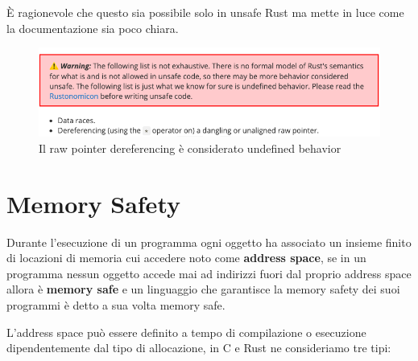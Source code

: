 \documentclass[Lau,binding=0.6cm]{sapthesis}
\begin{document}
È ragionevole che questo sia possibile solo in unsafe Rust ma mette in luce come la documentazione sia poco chiara. 




\begin{figure}[h!t]
    \centering
    \includegraphics[scale=0.52]{images/warning_undefined_behavior.png}
    \caption{Il raw pointer dereferencing è considerato undefined behavior}
    \label{fig:warning}
\end{figure}

\clearpage
\chapter{Memory Safety} \label{chap:memory_safety}

Durante l'esecuzione di un programma ogni oggetto ha associato un insieme finito di locazioni di memoria cui accedere noto come \textbf{address space}, se in un programma nessun oggetto accede mai ad indirizzi fuori dal proprio address space allora è \textbf{memory safe} e un linguaggio che garantisce la memory safety dei suoi programmi è detto a sua volta memory safe.

L'address space può essere definito a tempo di compilazione o esecuzione dipendentemente dal tipo di allocazione, in C e Rust ne consideriamo tre tipi:
\end{document}

